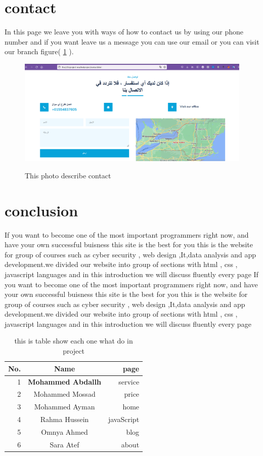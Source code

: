 \documentclass{article}
\begin{document}
\section{contact}
In this page we leave you with ways of how to contact us by using our phone number and if you want leave us a message you can use our email or you can visit our branch figure( \ref{fig:contact} ).

\begin{figure}
\centering
\includegraphics[scale=.2]{images/contact.png}
\label{fig:contact}
\caption{This photo describe contact }
\end{figure}

\section{conclusion}
If you want to become one of the most important programmers right now, and have your own successful buisness this site is the best for you this is the website for group of courses such as cyber security , web design ,It,data analysis and app development.we divided our website into group of sections with html , css , javascript languages and in this introduction we will discuss fluently every page If you want to become one of the most important programmers right now, and have your own successful buisness this site is the best for you this is the website for group of courses such as cyber security , web design ,It,data analysis and app development.we divided our website into group of sections with html , css , javascript languages and in this introduction we will discuss fluently every page
\begin{table}
\centering
\caption{this is table show each one what do in project}
\label{table:myteam}
\begin{tabular}{r | c r}
	\hline
	No. & Name & page \\
	\hline
	1 & \textbf{Mohammed Abdallh} & service \\
	2 & Mohammed Mossad  & price \\
	3 & Mohammed Ayman & home \\
	4 & Rahma Hussein  & javaScript \\
    5 & Omnya Ahmed & blog \\
	6 & Sara Atef  & about \\
	\hline
\end{tabular}
\end{table}
\end{document}
